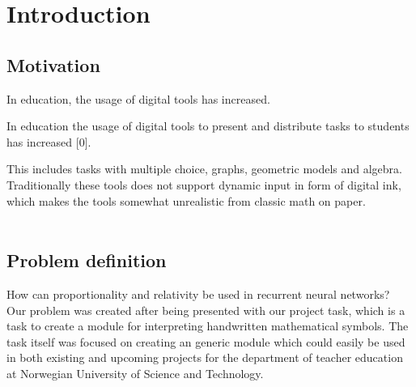 \chapter{Introduction}

\section{Motivation} %

In education, the usage of digital tools has increased. 




In education the usage of digital tools to present and distribute tasks to students has increased [0]. %

This includes tasks with multiple choice, graphs, geometric models and algebra. Traditionally these tools does not support dynamic input in form of digital ink, which makes the tools somewhat unrealistic from classic math on paper. \\

\\ %
\section{Problem definition} %
How can proportionality and relativity be used in recurrent neural networks? \\ Our problem was created after being presented with our project task, which is a task to create a module for interpreting handwritten mathematical symbols. The task itself was focused on creating an generic module which could easily be used in both existing and upcoming projects for the department of teacher education at Norwegian University of Science and Technology. \\ \\


